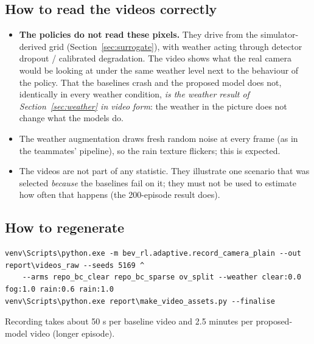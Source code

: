 \subsection{How to read the videos correctly}
\begin{itemize}
\item \textbf{The policies do not read these pixels.} They drive from the simulator-derived grid (Section~\ref{sec:surrogate}), with weather acting through detector dropout / calibrated degradation. The video shows what the real camera would be looking at under the same weather level next to the behaviour of the policy.
  That the baselines crash and the proposed model does not, identically in every weather condition, \emph{is the weather result of Section~\ref{sec:weather} in video form}: the weather in the picture does not change what the models do.
\item The weather augmentation draws fresh random noise at every frame (as in the teammates' pipeline), so the rain texture flickers; this is expected.
\item The videos are not part of any statistic. They illustrate one scenario that was selected \emph{because} the baselines fail on it; they must not be used to estimate how often that happens (the 200-episode result does).
\end{itemize}

\subsection{How to regenerate}
\begin{lstlisting}
venv\Scripts\python.exe -m bev_rl.adaptive.record_camera_plain --out report\videos_raw --seeds 5169 ^
    --arms repo_bc_clear repo_bc_sparse ov_split --weather clear:0.0 fog:1.0 rain:0.6 rain:1.0
venv\Scripts\python.exe report\make_video_assets.py --finalise
\end{lstlisting}
Recording takes about 50 s per baseline video and 2.5 minutes per proposed-model video (longer episode).
